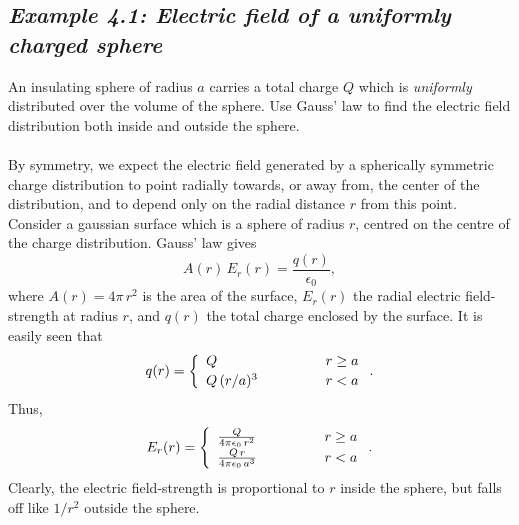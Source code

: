 \subsection*{\em Example 4.1: Electric field of a uniformly charged sphere}
 An insulating sphere of radius $a$ carries a total
charge $Q$ which is {\em uniformly} distributed over the volume of the
sphere. Use Gauss' law to find the electric field distribution both
inside and outside the sphere. \\
~\\
By symmetry, we expect the electric field generated by a spherically symmetric
charge distribution to point radially towards, or away from, the
center of the distribution, and to depend only on
the radial distance $r$ from this point. Consider a
gaussian surface which is a sphere of radius $r$, centred on the centre of the
charge distribution. Gauss' law gives
$$
A(r)\,E_r(r) = \frac{q(r)}{\epsilon_0},
$$
where $A(r) = 4\pi\, r^2$ is the area of the surface, $E_r(r)$ the radial electric
field-strength at radius $r$, and $q(r)$ the total charge enclosed by the
surface. It is easily seen that
$$
q(r) = 	
\left\{\begin{array}{lcl}
Q&\mbox{\hspace{1cm}}&r\geq a\\[0.5ex]
Q\,(r/a)^3&&r<a
\end{array}\right..
$$
Thus,
$$
E_r(r) =
\left\{\begin{array}{lcl}
\frac{Q}{4\pi\epsilon_0\,r^2}&\mbox{\hspace{1cm}}&r\geq a\\[0.5ex]
\frac{Q\,r}{4\pi\epsilon_0\,a^3}&&r<a
\end{array}\right..
$$
Clearly, the electric field-strength is proportional to $r$ inside the
sphere, but falls off like $1/r^2$ outside the sphere.


